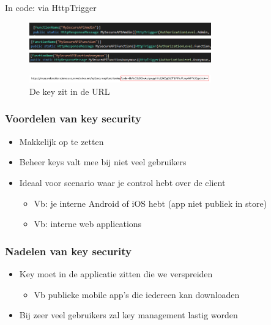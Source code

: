 \documentclass{article}
\begin{document}
In code: via HttpTrigger

\begin{figure}[H]
    \centering
    \includegraphics[width=0.7\textwidth]{azure-security-1.png}
    \includegraphics[width=0.7\textwidth]{azure-security-2.png}
    \includegraphics[width=0.7\textwidth]{azure-security-3.png}
    \caption{}
\end{figure}

\begin{figure}[H]
    \centering
    \includegraphics[width=0.7\textwidth]{azure-security-4.png}
    \caption{De key zit in de URL}
\end{figure}

\subsubsection{Voordelen van key security}
\begin{itemize}
    \item Makkelijk op te zetten
    \item Beheer keys valt mee bij niet veel gebruikers
    \item Ideaal voor scenario waar je control hebt over de client
    \begin{itemize}
        \item Vb: je interne Android of iOS hebt (app niet publiek in store)
        \item Vb: interne web applications
    \end{itemize}
\end{itemize}

\subsubsection{Nadelen van key security}
\begin{itemize}
    \item Key moet in de applicatie zitten die we verspreiden
    \begin{itemize}
        \item Vb publieke mobile app’s die iedereen kan downloaden
    \end{itemize}
    \item Bij zeer veel gebruikers zal key management lastig worden
\end{itemize}
\end{document}
